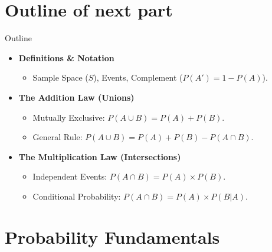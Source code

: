 \section{Outline of next part}
\begin{frame}{Outline}

    
    \begin{itemize}
        \item \textbf{Definitions \& Notation}
            \begin{itemize}
                \item Sample Space ($S$), Events, Complement ($P(A') = 1 - P(A)$).
            \end{itemize}
            
            
        \item \textbf{The Addition Law (Unions)}
            \begin{itemize}
                \item Mutually Exclusive: $P(A \cup B) = P(A) + P(B)$.
                \item General Rule: $P(A \cup B) = P(A) + P(B) - P(A \cap B)$.
            \end{itemize}
            
            
        \item \textbf{The Multiplication Law (Intersections)}
            \begin{itemize}
                \item Independent Events: $P(A \cap B) = P(A) \times P(B)$.
                \item Conditional Probability: $P(A \cap B) = P(A) \times P(B|A)$.
            \end{itemize}
    \end{itemize}
    
\end{frame}

\section{Probability Fundamentals}



